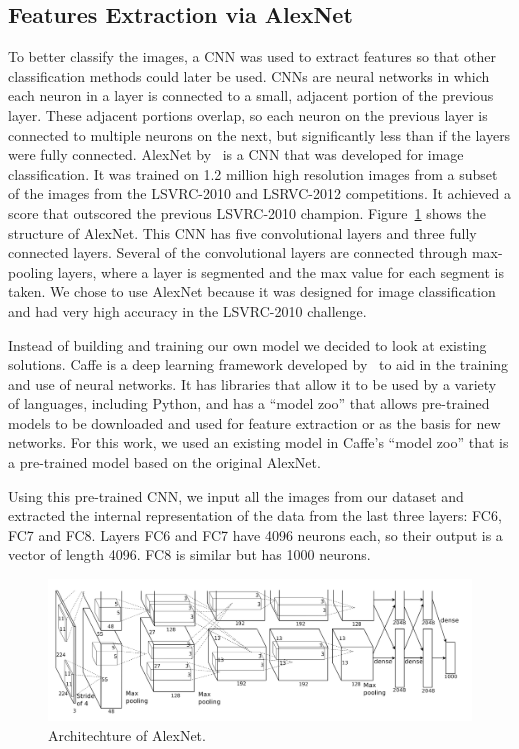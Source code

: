 \documentclass{article} %
\begin{document}
 
\subsection{Features Extraction via AlexNet}

To better classify the images, a CNN was used to extract features so that other classification methods could later be used. CNNs are neural networks in which each neuron in a layer is connected to a small, adjacent portion of the previous layer. These adjacent portions overlap, so each neuron on the previous layer is connected to multiple neurons on the next, but significantly less than if the layers were fully connected. AlexNet by~\citet{krizhevsky2012imagenet} is a CNN that was developed for image classification. It was trained on 1.2 million high resolution images from a subset of the images from the LSVRC-2010 and LSRVC-2012 competitions. It achieved a score that outscored the previous LSVRC-2010 champion. Figure~\ref{fig:alexnet} shows the structure of AlexNet. This CNN has five convolutional layers and three fully connected layers. Several of the convolutional layers are connected through max-pooling layers, where a layer is segmented and the max value for each segment is taken. We chose to use AlexNet because it was designed for image classification and had very high accuracy in the LSVRC-2010 challenge.

Instead of building and training our own model we decided to look at existing solutions. Caffe is a deep learning framework developed by~\citet{jia2014caffe} to aid in the training and use of neural networks. It has libraries that allow it to be used by a variety of languages, including Python, and has a ``model zoo'' that allows pre-trained models to be downloaded and used for feature extraction or as the basis for new networks. For this work, we used an existing model in Caffe's ``model zoo'' that is a pre-trained model based on the original AlexNet.

Using this pre-trained CNN, we input all the images from our dataset and extracted the internal representation of the data from the last three layers: FC6, FC7 and FC8. Layers FC6 and FC7 have 4096 neurons each, so their output is a vector of length 4096. FC8 is similar but has 1000 neurons.
\begin{figure}[h]
\centering
\includegraphics[width=\textwidth]{alexnet.png}
\caption{Architechture of AlexNet.}
\label{fig:alexnet}
\end{figure}
\end{document}
